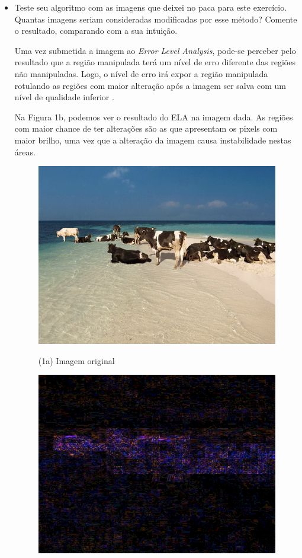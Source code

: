 \documentclass[12pt]{article}
\begin{document}
\begin{itemize}
\begin{itemize}
\item Teste seu algoritmo com as imagens que deixei no paca para este exercício. 
Quantas imagens seriam consideradas modificadas por esse método? Comente o resultado,
comparando com a sua intuição.

Uma vez submetida a imagem ao \textit{Error Level Analysis}, pode-se perceber pelo resultado que 
a região manipulada terá um nível de erro diferente das regiões não manipuladas. Logo, 
o nível de erro irá expor a região manipulada rotulando as regiões com maior alteração após
a imagem ser salva com um nível de qualidade inferior \cite{krawetz}.

Na Figura 1b, podemos ver o resultado do ELA na imagem dada. As regiões com maior chance de ter
alterações são as que apresentam os pixels com maior brilho, uma vez que a alteração da imagem 
causa instabilidade nestas áreas.
\begin{figure}[htb]
\centering
\begin{minipage}[b]{0.45\textwidth}
	\centering
        \includegraphics[scale=0.3]{Q3Images/cows_on_beach.jpg} 
	\centerline{\label{fig1a} \small (1a) Imagem original}
\end{minipage}
\begin{minipage}[b]{0.45\textwidth}
	\centering
        \includegraphics[scale=0.3]{Q3Images/cows_on_beach_ela.jpg} 

\end{minipage}
\end{figure}
\end{itemize}
\end{itemize}
\end{document}
